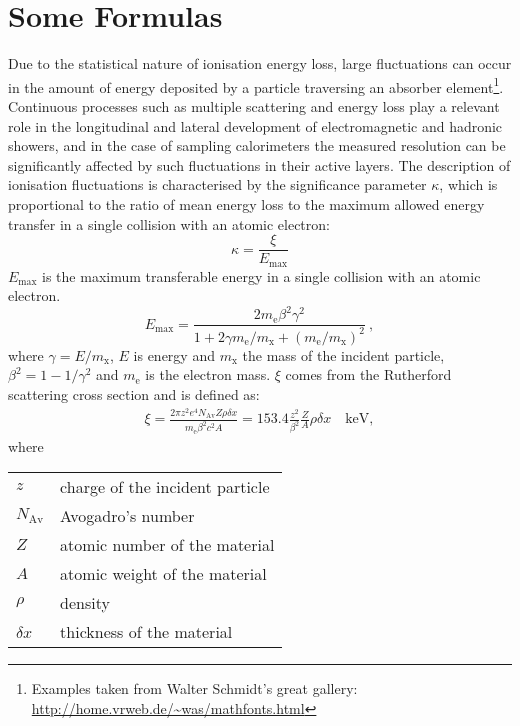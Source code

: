 \section{Some Formulas}

Due to the statistical nature of ionisation energy loss, large fluctuations can occur in the amount of energy deposited by a particle traversing an absorber element\footnote{Examples taken from Walter Schmidt's great gallery: \\ \url{http://home.vrweb.de/~was/mathfonts.html}}.  Continuous processes such as multiple scattering and energy loss play a relevant role in the longitudinal and lateral development of electromagnetic and hadronic showers, and in the case of sampling calorimeters the measured resolution can be significantly affected by such fluctuations in their active layers.  The description of ionisation fluctuations is characterised by the significance parameter $\kappa$, which is proportional to the ratio of mean energy loss to the maximum allowed energy transfer in a single collision with an atomic electron: 
\begin{equation}
\kappa =\frac{\xi}{E_{\mathrm{max}}} %
\end{equation}
$E_{\mathrm{max}}$ is the maximum transferable energy in a single collision with an atomic electron.
\[E_{\mathrm{max}} =\frac{2 m_{\mathrm{e}} \beta^2\gamma^2 }{1 + 2\gamma m_{\mathrm{e}}/m_{\mathrm{x}} + \left ( m_{\mathrm{e}} /m_{\mathrm{x}}\right)^2}\ ,\]
where $\gamma = E/m_{\mathrm{x}}$, $E$ is energy and $m_{\mathrm{x}}$ the mass of the incident particle, $\beta^2 = 1 - 1/\gamma^2$ and $m_{\mathrm{e}}$ is the electron mass. $\xi$ comes from the Rutherford scattering cross section and is defined as:
\begin{eqnarray*} \xi  = \frac{2\pi z^2 e^4 N_{\mathrm{Av}} Z \rho
\delta x}{m_{\mathrm{e}} \beta^2 c^2 A} =  153.4 \frac{z^2}{\beta^2}
\frac{Z}{A}
\rho \delta x \quad\mathrm{keV},
\end{eqnarray*}
where

\begin{tabular}{ll}
$z$ & charge of the incident particle \\
$N_{\mathrm{Av}}$ & Avogadro's number \\
$Z$ & atomic number of the material \\
$A$ & atomic weight of the material \\
$\rho$ & density \\
$ \delta x$ & thickness of the material \\
\end{tabular}

